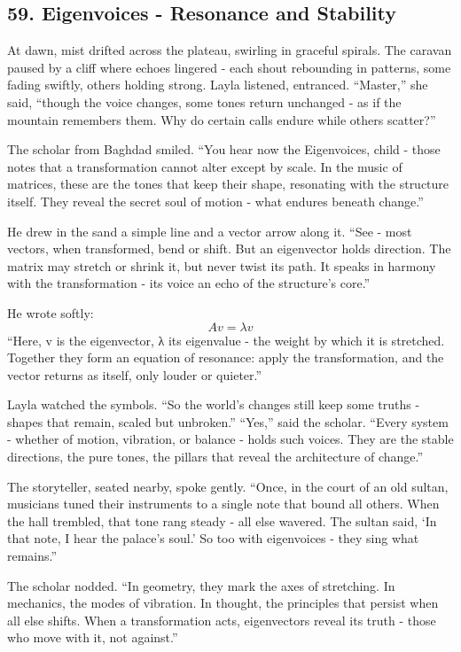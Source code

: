 \documentclass[
  letterpaper,
  DIV=11,
  numbers=noendperiod]{scrreprt}
\begin{document}
\subsection{59. Eigenvoices - Resonance and
Stability}\label{eigenvoices---resonance-and-stability}

At dawn, mist drifted across the plateau, swirling in graceful spirals.
The caravan paused by a cliff where echoes lingered - each shout
rebounding in patterns, some fading swiftly, others holding strong.
Layla listened, entranced. ``Master,'' she said, ``though the voice
changes, some tones return unchanged - as if the mountain remembers
them. Why do certain calls endure while others scatter?''

The scholar from Baghdad smiled. ``You hear now the Eigenvoices, child -
those notes that a transformation cannot alter except by scale. In the
music of matrices, these are the tones that keep their shape, resonating
with the structure itself. They reveal the secret soul of motion - what
endures beneath change.''

He drew in the sand a simple line and a vector arrow along it. ``See -
most vectors, when transformed, bend or shift. But an eigenvector holds
direction. The matrix may stretch or shrink it, but never twist its
path. It speaks in harmony with the transformation - its voice an echo
of the structure's core.''

He wrote softly: \[
A v = \lambda v
\] ``Here, v is the eigenvector, λ its eigenvalue - the weight by which
it is stretched. Together they form an equation of resonance: apply the
transformation, and the vector returns as itself, only louder or
quieter.''

Layla watched the symbols. ``So the world's changes still keep some
truths - shapes that remain, scaled but unbroken.'' ``Yes,'' said the
scholar. ``Every system - whether of motion, vibration, or balance -
holds such voices. They are the stable directions, the pure tones, the
pillars that reveal the architecture of change.''

The storyteller, seated nearby, spoke gently. ``Once, in the court of an
old sultan, musicians tuned their instruments to a single note that
bound all others. When the hall trembled, that tone rang steady - all
else wavered. The sultan said, `In that note, I hear the palace's soul.'
So too with eigenvoices - they sing what remains.''

The scholar nodded. ``In geometry, they mark the axes of stretching. In
mechanics, the modes of vibration. In thought, the principles that
persist when all else shifts. When a transformation acts, eigenvectors
reveal its truth - those who move with it, not against.''
\end{document}
